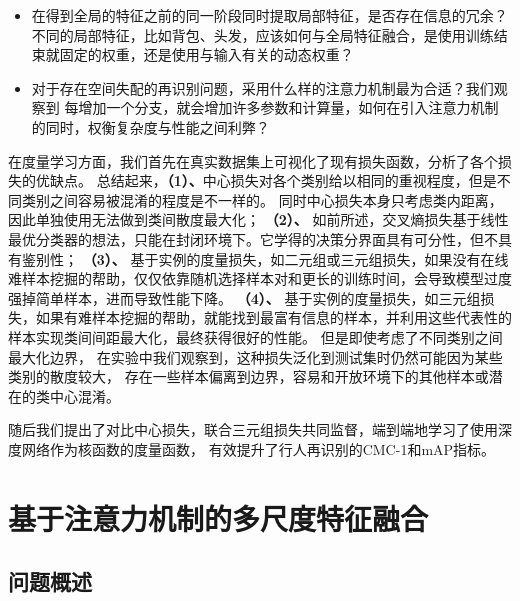 \begin{itemize}
	\item \cite{zhao2017part} 在得到全局的特征之前的同一阶段同时提取局部特征，是否存在信息的冗余？
	      不同的局部特征，比如背包、头发，应该如何与全局特征融合，是使用训练结束就固定的权重，还是使用与输入有关的动态权重？
	\item 对于存在空间失配的再识别问题，采用什么样的注意力机制最为合适？我们观察到\cite{zhao2017part} 每增加一个分支，就会增加许多参数和计算量，如何在引入注意力机制的同时，权衡复杂度与性能之间利弊？
\end{itemize}

在度量学习方面，我们首先在真实数据集上可视化了现有损失函数，分析了各个损失的优缺点。
总结起来，\textbf{（1）、}中心损失对各个类别给以相同的重视程度，但是不同类别之间容易被混淆的程度是不一样的。
同时中心损失本身只考虑类内距离，因此单独使用无法做到类间散度最大化；
\textbf{（2）、}
如前所述，交叉熵损失基于线性最优分类器的想法，只能在封闭环境下。它学得的决策分界面具有可分性，但不具有鉴别性；
\textbf{（3）、}
基于实例的度量损失，如二元组或三元组损失，如果没有在线难样本挖掘的帮助\cite{yaqing2016semantics}，仅仅依靠随机选择样本对和更长的训练时间，会导致模型过度强掉简单样本，进而导致性能下降。
\textbf{（4）、}
基于实例的度量损失，如三元组损失，如果有难样本挖掘的帮助，就能找到最富有信息的样本，并利用这些代表性的样本实现类间间距最大化，最终获得很好的性能。
但是即使考虑了不同类别之间最大化边界，
在实验中我们观察到，这种损失泛化到测试集时仍然可能因为某些类别的散度较大，
存在一些样本偏离到边界，容易和开放环境下的其他样本或潜在的类中心混淆。

随后我们提出了对比中心损失，联合三元组损失共同监督，端到端地学习了使用深度网络作为核函数的度量函数，
有效提升了行人再识别的CMC-1和mAP指标。

\chapter{基于注意力机制的多尺度特征融合} \label{chap:attention}

\section{问题概述}

